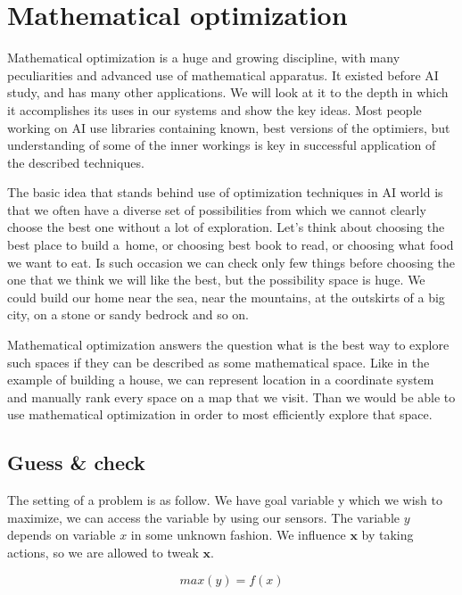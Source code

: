 \chapter{Mathematical optimization}
\label{chap:optimization}

Mathematical optimization is a huge and growing discipline, with many peculiarities and advanced use of mathematical apparatus. It existed before AI study, and has many other applications. We will look at it to the depth in which it accomplishes its uses in our systems and show the key ideas. Most people working on AI use libraries containing known, best versions of the optimiers, but understanding of some of the inner workings is key in successful application of the described techniques. 

The basic idea that stands behind use of optimization techniques in AI world is that we often have a diverse set of possibilities from which we cannot clearly choose the best one without a lot of exploration. Let’s think about choosing the best place to build a~home, or choosing best book to read, or choosing what food we want to eat. Is such occasion we can check only few things before choosing the one that we think we will like the best, but the possibility space is huge. We could build our home near the sea, near the mountains, at the outskirts of a big city, on a stone or sandy bedrock and so on. 

Mathematical optimization answers the question what is the best way to explore such spaces if they can be described as some mathematical space. Like in the example of building a house, we can represent location in a coordinate system and manually rank every space on a map that we visit. Than we would be able to use mathematical optimization in order to most efficiently explore that space.

\section{Guess \& check}

The setting of a problem is as follow. We have goal variable y which we wish to maximize, we can access the variable by using our sensors. The variable $y$ depends on variable $x$ in some unknown fashion. We influence $\boldsymbol{x}$ by taking actions, so we are allowed to tweak $\boldsymbol{x}$.

\begin{equation}
	max(y) = f(x)
\end{equation}


